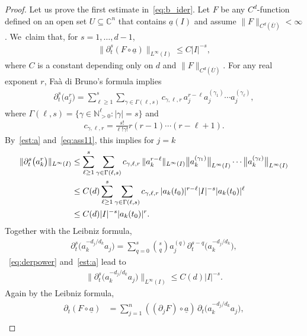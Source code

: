 \documentclass[11pt]{article}
\numberwithin{equation}{section}
\numberwithin{equation}{section}
\def\ga{\gamma}
\def\Ga{\Gamma}
\def\C{\mathbb{C}}
\def\N{\mathbb{N}}
\def\p{\partial}
\def\ol{\overline}
\def\ul{\underline}
\renewcommand{\o}{\circ}
\begin{document}
\begin{proof}
 Let us prove the first estimate in~\eqref{eq:b_ider}.
 Let $F$ be any $C^d$-function defined on an open set $U\subseteq \C^{n}$ that contains
 $\underline a(I)$ and assume $\|F\|_{C^d(\ol U)} < \infty$. We~claim that, for $s = 1,\dots,d-1$,
 \begin{gather} \label{eq:B2}
 \|\p_t^s (F \o \ul a)\|_{L^\infty(I)} \le C |I|^{-s},
 \end{gather}
 where
 $C$ is a constant depending only on $d$ and $\|F\|_{C^d(\ol U)}$.
 For any real exponent $r$, Fa\`a di Bruno's formula implies
 \begin{gather} \label{FaadiBruno}
 \p_t^{s} \big(a_j^{r} \big) =
 \sum_{\ell \ge 1}^{s} \sum_{\ga \in \Ga(\ell,s)} c_{\ga,\ell,r}
 \, a_j^{r-\ell} a_j^{(\ga_1)} \cdots a_j^{(\ga_\ell)},
 \end{gather}
 where $\Ga(\ell,s) = \{\ga \in \N_{>0}^\ell \colon |\ga| = s\}$ and
 \begin{gather*}
 c_{\ga,\ell,r}= \frac{s!}{\ell! \ga!} r(r-1) \cdots (r-\ell+1).
 \end{gather*}
 By~\eqref{est:a} and~\eqref{eq:ass11}, this implies for $j=k$
 \begin{align}
 \|\p_t^{s} \big( a_k^{r} \big)\|_{L^\infty(I)}
 &\le
 \sum_{\ell \ge 1}^{s} \sum_{\ga \in \Ga(\ell,s)} c_{\ga,\ell,r}
 \, \|a_k^{r-\ell}\|_{L^\infty(I)} \big\|a_k^{(\ga_1)}\big\|_{L^\infty(I)}
 \cdots \big\|a_k^{(\ga_\ell)}\big\|_{L^\infty(I)}
 \notag \\
 &\le
 C(d) \sum_{\ell \ge 1}^{s} \sum_{\ga \in \Ga(\ell,s)} c_{\ga,\ell,r}
 \, |a_k(t_0)|^{r-\ell}
 |I|^{-s} |a_k(t_0)|^{\ell}
 \notag \\
 &\le
 C(d)
 |I|^{-s} |a_k(t_0)|^{r }.\label{eq:derpower}
 \end{align}
 Together with the Leibniz formula,
 \begin{gather*}
 \p_t^s \big( a_k^{- d_j/d_k} a_j\big)
 = \sum_{q=0}^{s} \binom{s}{q} a_j^{(q)} \p_t^{s-q} \big( a_k^{- d_j/d_k} \big),
 \end{gather*}
~\eqref{eq:derpower} and~\eqref{est:a} lead to
 \begin{gather} \label{eq:underlinea}
\big \|\p_t^s \big(a_k^{- d_j/d_k} a_j\big) \big\|_{L^\infty(I)}
 \le C(d) |I|^{-s}.
 \end{gather}
 Again by the Leibniz formula,
 \begin{align*}
 \p_t (F \o \ul a)
 &= \sum_{j=1}^n ((\p_{j} F)\o \ul a)\, \p_t \big( a_k^{- d_j/d_k} a_j\big),
 \\

\end{align*}
\end{proof}
\end{document}
